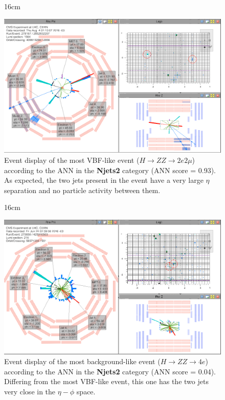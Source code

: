  
\begin{figure}[H!]{16cm}
	\vspace{-20cm}
	\caption{Event display of the most VBF-like event ($H \rightarrow ZZ \rightarrow 2e2\mu$) according to the ANN in the \textbf{Njets2} category (ANN score = 0.93). As expected, the two jets present in the event have a very large $\eta$ separation and no particle activity between them.}
	\includegraphics[scale=0.7,angle=90]{ChapterAnalysis/figs/event_display_Run278167_Lumi1564_Event2852832207_Njets2_ANN0p93_DoubleEG_Run2016F_2}
\end{figure}

\begin{figure}[H!]{16cm}
	\caption{Event display of the most background-like event ($H \rightarrow ZZ \rightarrow 4e$) according to the ANN in the \textbf{Njets2} category (ANN score = 0.04). Differing from the most VBF-like event, this one has the two jets very close in the $\eta-\phi$ space.}
	\includegraphics[scale=0.7,angle=90]{ChapterAnalysis/figs/event_display_Run275658_Lumi216_Event425010503_Njets2_ANN0p15_DoubleEG_Run2016C_2}
\end{figure}

